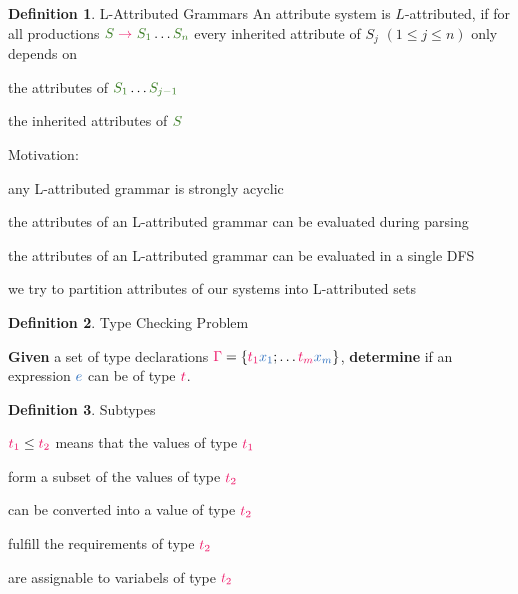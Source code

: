 \documentclass[10pt, landscape]{article}
\theoremstyle{definition}
\newtheorem{definition}{Definition}[section]
\newcommand{\Op}[1]{\textcolor{WildStrawberry}{#1}}
\newcommand{\derive}[1][]{\Op{\;\rightarrow_{#1}\;}}
\newcommand{\nontermcolor}{OliveGreen}
\newcommand{\nt}[1]{\textcolor{\nontermcolor}{#1}}
\newcommand{\ntS}{\nt{S}}
\newcommand{\termcolor}{NavyBlue}
\newcommand{\prodcolor}{WildStrawberry}
\newcommand{\typecolor}{WildStrawberry}
\newcommand{\type}[1]{\textcolor{\typecolor}{#1}}
\begin{document}
\begin{multicols*}{3}
\begin{definition}{L-Attributed Grammars}
  An attribute system is $L$-attributed, if for all productions $\ntS \derive \nt{S_{1}} \dots \nt{S_{n}}$ every inherited attribute of $S_{j}$ $(1 \le j \le n)$ only depends on
  \begin{compactitem}
    \item the attributes of $\nt{S_{1}} \dots \nt{S_{j - 1}}$
    \item the inherited attributes of $\ntS$
  \end{compactitem}



  Motivation:

  \begin{compactitem}
    \item any L-attributed grammar is strongly acyclic
    \item the attributes of an L-attributed grammar can be evaluated during parsing
    \item the attributes of an L-attributed grammar can be evaluated in a single DFS
    \item we try to partition attributes of our systems into L-attributed sets
  \end{compactitem}

\end{definition}

\begin{definition}{Type Checking Problem}

  \textbf{Given} a set of type declarations $\textcolor{\prodcolor}{\Gamma} = \{ \textcolor{\prodcolor}{t_{1}} \textcolor{\termcolor}{x_{1}}; \dots  \textcolor{\prodcolor}{t_{m}} \textcolor{\termcolor}{x_{m}}\}$, \textbf{determine} if an expression $\textcolor{\termcolor}{e}$ can be of type $\textcolor{\prodcolor}{t}$.

\end{definition}

\begin{definition}{Subtypes}

  $\type{t_{1}} \le \type{t_{2}}$ means that the values of type $\type{t_{1}}$
  \begin{compactenum}
    \item form a subset of the values of type $\type{t_{2}}$
    \item can be converted into a value of type $\type{t_{2}}$
    \item fulfill the requirements of type $\type{t_{2}}$
    \item are assignable to variabels of type $\type{t_{2}}$
  \end{compactenum}



\end{definition}
\end{multicols*}
\end{document}
